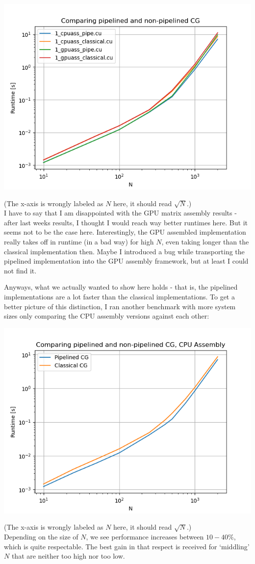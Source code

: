 \documentclass[11pt]{article}
\begin{document}
\includegraphics[scale=0.8]{plots/1comp_quad.png}

(The x-axis is wrongly labeled as \(N\) here, it should read \(\sqrt{N}\).) \\
I have to say that I am disappointed with the GPU matrix assembly results - after last weeks results, I thought I would reach way better runtimes here. But it seems not to be the case here. Interestingly, the GPU assembled implementation really takes off in runtime (in a bad way) for high \(N\), even taking longer than the classical implementation then. Maybe I introduced a bug while transporting the pipelined implementation into the GPU assembly framework, but at least I could not find it.

Anyways, what we actually wanted to show here holds - that is, the pipelined implementations are a lot faster than the classical implementations. To get a better picture of this distinction, I ran another benchmark with more system sizes only comparing the CPU assembly versions against each other:

\includegraphics[scale=0.8]{plots/1comp_dual.png}

(The x-axis is wrongly labeled as \(N\) here, it should read \(\sqrt{N}\).) \\
Depending on the size of \(N\), we see performance increases between \(10-40\%\), which is quite respectable. The best gain in that respect is received for `middling' \(N\) that are neither too high nor too low.
\end{document}
